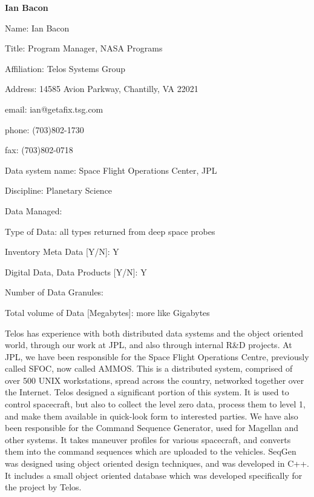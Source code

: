 \begin{center}
\LARGE
 {\bf Ian Bacon}
\end{center}

\bigskip
\large
{}

\normalsize
\smallskip
\begin{description}
\item{Name:}  Ian Bacon
\item{Title:}  Program Manager, NASA Programs
\item{Affiliation:}  Telos Systems Group
\item{Address:}  14585 Avion Parkway, Chantilly, VA  22021
\item{email:}  ian@getafix.tsg.com
\item{phone:}  (703)802-1730
\item{fax:}  (703)802-0718
\end{description}
\medskip
\large
{}
\normalsize
\medskip
\begin{description}

\item{Data system name:}  Space Flight Operations Center, JPL
\item{Discipline:}  Planetary Science
\item{Data Managed:}
	\begin{description}
	\item{Type of Data:}  all types returned from deep space probes
	\item{Inventory Meta Data [Y/N]:}  Y
	\item{Digital Data, Data Products [Y/N]:}  Y
	\item{Number of Data Granules:}
	\item{Total volume of Data [Megabytes]:}  more like Gigabytes
	\end{description}
\end{description}

\medskip
\large
{}
\normalsize

\medskip
 	Telos has experience with both distributed data systems and the
  object oriented world, through our work at JPL, and also through internal
  R\&D projects.  At JPL, we have been responsible for the Space Flight
  Operations Centre, previously called SFOC, now called AMMOS. This is a
  distributed system, comprised of over 500 UNIX workstations, spread across
  the country, networked together over the Internet. Telos designed a
  significant portion of this system. It is used to control spacecraft, but
  also to collect the level zero data, process them to level 1, and make them
  available in quick-look form to interested parties.  We have also been
  responsible for the Command Sequence Generator, used for Magellan and other
  systems. It takes maneuver profiles for various spacecraft, and converts
  them into the command sequences which are uploaded to the vehicles.  SeqGen
  was designed using object oriented design techniques, and was developed in
  C++. It includes a small object oriented database which was developed
  specifically for the project by Telos.

